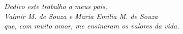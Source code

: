 \begin{dedicatoria}
   \vspace*{\fill}
   \begin{flushright}
   	\textit{Dedico este trabalho a meus pais, \\ Valmir M. de Souza e Maria Emilia M. de Souza \\ que, com muito amor, me ensinaram os valores da vida.}
   	
   \end{flushright}
\end{dedicatoria}
